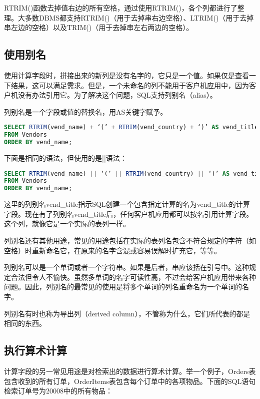 RTRIM()函数去掉值右边的所有空格，通过使用RTRIM()，各个列都进行了整理。大多数DBMS都支持RTRIM()（用于去掉串右边空格）、LTRIM()（用于去掉串左边的空格）以及TRIM()（用于去掉串左右两边的空格）。
\subsection{使用别名}

使用计算字段时，拼接出来的新列是没有名字的，它只是一个值。如果仅是查看一下结果，这可以满足需求。但是，一个未命名的列不能用于客户机应用中，因为客户机没有办法引用它。为了解决这个问题，SQL支持列别名（alias）。

列别名是一个字段或值的替换名，用AS关键字赋予。

\begin{lstlisting}[language=SQL]
SELECT RTRIM(vend_name) + ‘(’ + RTRIM(vend_country) + ‘)’ AS vend_title
FROM Vendors
ORDER BY vend_name;
\end{lstlisting}

下面是相同的语法，但使用的是||语法：

\begin{lstlisting}[language=SQL]
SELECT RTRIM(vend_name) || ‘(’ || RTRIM(vend_country) || ‘)’ AS vend_title
FROM Vendors
ORDER BY vend_name;
\end{lstlisting}

这里的列别名vend\_title指示SQL创建一个包含指定计算的名为vend\_title的计算字段。现在有了列别名vend\_title后，任何客户机应用都可以按名引用计算字段。这个列，就像它是一个实际的表列一样。

列别名还有其他用途，常见的用途包括在实际的表列名包含不符合规定的字符（如空格）时重新命名它，在原来的名字含混或容易误解时扩充它，等等。

列别名可以是一个单词或者一个字符串。如果是后者，串应该括在引号中。这种规定合法但令人不愉快。虽然多单词的名字可读性高，不过会给客户机应用带来各种问题。因此，列别名的最常见的使用是将多个单词的列名重命名为一个单词的名字。

列别名有时也称为导出列（derived column），不管称为什么，它们所代表的都是相同的东西。
\subsection{执行算术计算}

计算字段的另一常见用途是对检索出的数据进行算术计算。举一个例子，Orders表包含收到的所有订单，OrderItems表包含每个订单中的各项物品。下面的SQL语句检索订单号为20008中的所有物品：

